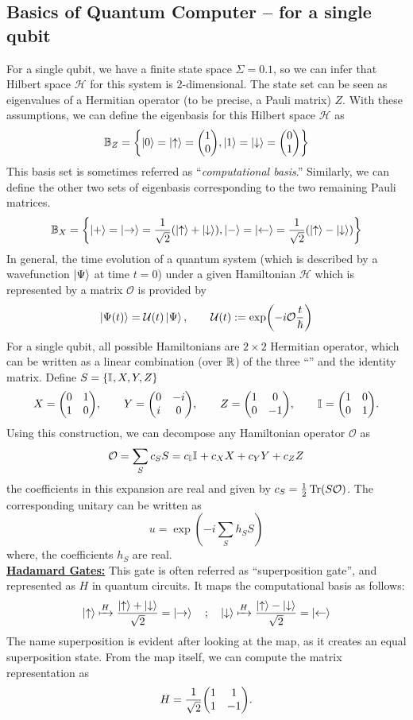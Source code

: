 \documentclass[11pt, oneside, listof=totoc]{scrbook}
\renewcommand{\H}{\mathcal{H}}
\renewcommand{\O}{\mathcal{O}}
\newcommand{\ku}{\ket{\uparrow}}
\newcommand{\kd}{\ket{\downarrow}}
\newcommand{\kr}{\ket{\rightarrow}}
\newcommand{\kl}{\ket{\leftarrow}}
\newcommand{\UU}{\mathcal{U}}
\begin{document}
\subsection{Basics of Quantum Computer -- for a single qubit}
For a single qubit, we have a finite state space \(\Sigma = \qty{0, 1}\), so we can infer that Hilbert space \(\H\) for this system is 2-dimensional. The state set can be seen as eigenvalues of a Hermitian operator (to be precise, a Pauli matrix) \(Z\). With these assumptions, we can define the eigenbasis for this Hilbert space \(\H\) as
\[
    \B_Z = \qty{\ket{0} = \ku = \mqty(1 \\ 0), \ket{1}= \kd = \mqty(0 \\ 1)}
\]
This basis set is sometimes referred as ``\emph{computational basis}.'' Similarly, we can define the other two sets of eigenbasis corresponding to the two remaining Pauli matrices.
\begin{equation}
    \B_X = \qty{\ket{+} = \kr = \frac{1}{\sqrt{2}} \qty(\ku + \kd), \ket{-} = \kl = \frac{1}{\sqrt{2}} \qty(\ku - \kd)}
\end{equation}
In general, the time evolution of a quantum system (which is described by a wavefunction \(\ket{\Psi}\) at time \(t = 0\)) under a given Hamiltonian \(\mathscr{H}\) which is represented by a matrix \(\O\) is provided by
\[
    \ket{\Psi (t)} = \UU(t) \ket{\Psi}, \qquad \UU(t) := \exp(- i \O \frac{t}{\hslash})
\]
For a single qubit, all possible Hamiltonians are \(2 \times 2\) Hermitian operator, which can be written as a linear combination (over \(\mathbb R\)) of the three ``'' and the identity matrix. Define \(S = \qty{\mathbb{I}_{}, X, Y, Z}\)
\begin{equation}
    X = \mqty(0 & 1 \\ 1 & 0), \qquad Y = \mqty(0 & -i \\ i & 0), \qquad Z = \mqty(1 & 0 \\ 0 & -1), \qquad \I{} = \mqty(1 & 0 \\ 0 & 1).
\end{equation}
Using this construction, we can decompose any Hamiltonian operator \(\O\) as
\[
    \O = \sum_{S} c_S S = c_{\I{}} \I{} + c_X X + c_Y Y + c_Z Z
\]
the coefficients in this expansion are real and given by \(c_S = \half \Tr(S \O)\). The corresponding unitary can be written as
\[
    u = \exp(- i \sum_{S} h_S S)
\]
where, the coefficients \(h_S\) are real.\\
{\bfseries \uline{Hadamard Gates:}} This gate is often referred as ``superposition gate'', and represented as \(H\) in quantum circuits. It maps the computational basis as follows:
\begin{equation*}
    \ku \xmapsto{H} \frac{\ku + \kd}{\sqrt{2}} = \kr \quad ; \quad \kd \xmapsto{H} \frac{\ku - \kd}{\sqrt{2}} = \kl
\end{equation*}
The name superposition is evident after looking at the map, as it creates an equal superposition state. From the map itself, we can compute the matrix representation as
\begin{equation}\label{eq:hadamard}
    H = \frac{1}{\sqrt{2}} \mqty(1 & 1 \\ 1 & -1).
\end{equation}
\end{document}
